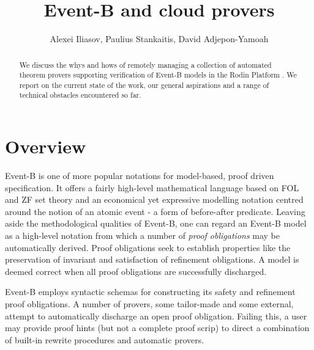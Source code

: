 \documentclass{llncs}
\begin{document}
\title{Event-B and cloud provers}


\author{Alexei Iliasov, Paulius Stankaitis, David Adjepon-Yamoah}


\date{}

\maketitle

\begin{abstract}
We discuss the whys and hows of remotely managing a collection of automated theorem provers supporting verification of Event-B models in the Rodin Platform \cite{RodinPlatform}. We report on the current state of the work, our general aspirations and a range of technical obstacles encountered so far. 
\end{abstract}


\section{Overview}

Event-B \cite{EventBBook} is one of more popular notations for model-based, proof driven specification. It offers a fairly high-level mathematical language based on FOL and ZF set theory and an economical yet expressive modelling notation centred around the notion of an atomic event - a form of before-after predicate. Leaving aside the methodological qualities of Event-B, one can regard an Event-B model as a high-level notation from which a number of \emph{proof obligations} may be automatically derived. Proof obligations seek to establish properties like the preservation of invariant and satisfaction of refinement obligations. A model is deemed correct when all proof obligations are successfully discharged. 

Event-B employs syntactic schemas for constructing its safety and refinement proof obligations. A number of provers, some tailor-made and some external, attempt to automatically discharge an open proof obligation. Failing this, a user may provide proof hints (but not a complete proof scrip) to direct a combination of built-in rewrite procedures and automatic provers.
\end{document}
